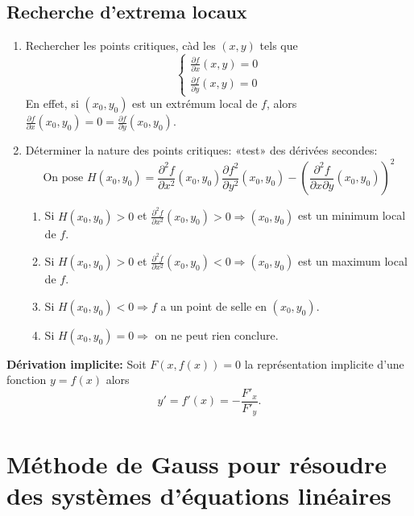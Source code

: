 \subsection{Recherche d'extrema locaux}

\begin{enumerate}
\item Rechercher les points critiques, càd les $(x,y)$ tels que
\[\begin{cases} \frac{\partial f}{\partial x}(x,y) = 0 \\ \frac{\partial f}{\partial y}(x,y) = 0 \end{cases} \]
En effet, si $(x_0,y_0)$ est un extrémum local de $f$, alors $\frac{\partial f}{\partial x}(x_0,y_0) = 0 = \frac{\partial f}{\partial y}(x_0,y_0)$.
\item Déterminer la nature des points critiques: «test» des dérivées secondes:
\[\text{On pose }H(x_0,y_0) = \frac{\partial^2 f}{\partial x^2}(x_0,y_0)\frac{\partial f^2}{\partial y^2}(x_0,y_0) - \left(\frac{\partial^2 f}{\partial x\partial y}(x_0,y_0)\right)^2\]
\begin{enumerate}
\item Si $H(x_0,y_0) > 0$ et $\frac{\partial^2 f}{\partial x^2}(x_0,y_0) > 0 \Longrightarrow (x_0,y_0)$ est un minimum local de $f$.
\item Si $H(x_0,y_0) > 0$ et $\frac{\partial^2 f}{\partial x^2}(x_0,y_0) < 0 \Longrightarrow (x_0,y_0)$ est un maximum local de $f$.
\item Si $H(x_0,y_0) < 0 \Longrightarrow f$ a un point de selle en $(x_0,y_0)$.
\item Si $H(x_0,y_0) = 0 \Longrightarrow$ on ne peut rien conclure.
\end{enumerate}
\end{enumerate}

\textbf{Dérivation implicite:} Soit $F(x,f(x)) = 0$ la représentation implicite d'une fonction $y=f(x)$ alors \[y' = f'(x) = - \frac{F'_x}{F'_y}.\]

\section{Méthode de Gauss pour résoudre des systèmes d'équations linéaires}


